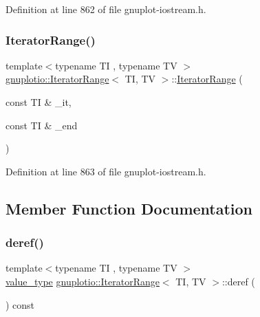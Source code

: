 Definition at line 862 of file gnuplot-\/iostream.\+h.

\mbox{\label{classgnuplotio_1_1_iterator_range_adb89135fc292dfc5152120bc7fe6135e}} 
\subsubsection{\texorpdfstring{Iterator\+Range()}{IteratorRange()}\hspace{0.1cm}{\footnotesize\ttfamily [2/2]}}
{\footnotesize\ttfamily template$<$typename TI , typename TV $>$ \\
\hyperlink{classgnuplotio_1_1_iterator_range}{gnuplotio\+::\+Iterator\+Range}$<$ TI, TV $>$\+::\hyperlink{classgnuplotio_1_1_iterator_range}{Iterator\+Range} (\begin{DoxyParamCaption}\item[{const TI \&}]{\+\_\+it,  }\item[{const TI \&}]{\+\_\+end }\end{DoxyParamCaption})\hspace{0.3cm}{\ttfamily [inline]}}



Definition at line 863 of file gnuplot-\/iostream.\+h.



\subsection{Member Function Documentation}
\mbox{\label{classgnuplotio_1_1_iterator_range_a516ffb8c3716ef5e30f067b595f7dbfb}} 
\subsubsection{\texorpdfstring{deref()}{deref()}}
{\footnotesize\ttfamily template$<$typename TI , typename TV $>$ \\
\hyperlink{classgnuplotio_1_1_iterator_range_a3d997739282df372a894c586c64a0687}{value\+\_\+type} \hyperlink{classgnuplotio_1_1_iterator_range}{gnuplotio\+::\+Iterator\+Range}$<$ TI, TV $>$\+::deref (\begin{DoxyParamCaption}{ }\end{DoxyParamCaption}) const\hspace{0.3cm}{\ttfamily [inline]}}



